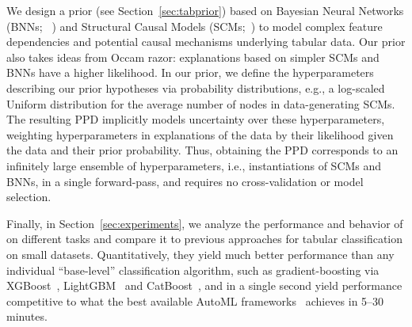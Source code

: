 \documentclass{article}
\begin{document}
We design a prior (see Section~\ref{sec:tabprior}) based on Bayesian Neural Networks (BNNs; ~\citealt{neal-bayes96a,gal-phdthesis16a}) and Structural Causal Models (SCMs;~\citealt{pearl_2009,causalinferencelearningbook}) to model complex feature dependencies and potential causal mechanisms underlying tabular data.
Our prior also takes ideas from Occam razor: explanations based on simpler SCMs and BNNs have a higher likelihood.
In our prior, we define the hyperparameters describing our prior hypotheses via probability distributions, e.g., a log-scaled Uniform distribution for the average number of nodes in data-generating SCMs.
The resulting PPD implicitly models uncertainty over these hyperparameters, weighting hyperparameters in explanations of the data by their likelihood given the data and their prior probability.
Thus, obtaining the PPD corresponds to an infinitely large ensemble of hyperparameters, i.e., instantiations of SCMs and BNNs, in a single forward-pass, and requires no cross-validation or model selection.

Finally, in Section~\ref{sec:experiments}, we analyze the performance and behavior of \methodname{} on different tasks and compare it to previous approaches for tabular classification on small datasets. 
Quantitatively, they yield much better performance than any individual ``base-level'' classification algorithm, such as gradient-boosting via XGBoost~\citep{chen-kdd16a}, LightGBM~\citep{ke-neurips17a} and CatBoost~\citep{prokhorenkova-neurips18a}, and in a single second yield performance competitive to what the best available AutoML frameworks~\citep{erickson-arxiv20a,feurer-arxiv20a} achieves in 5--30 minutes.

\end{document}
